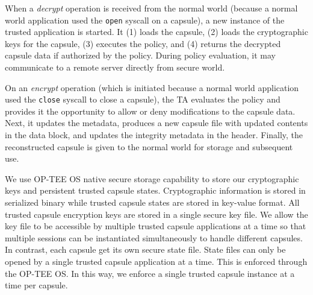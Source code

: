 When a {\em decrypt} operation is received from the normal world (because a
normal world application used the {\tt open} syscall on a capsule), a new
instance of the trusted application is started. It (1) loads the capsule, (2)
loads the cryptographic keys for the capsule, (3) executes the policy, and (4)
returns the decrypted capsule data if authorized by the policy. During policy
evaluation, it may communicate to a remote server directly from secure world.

On an {\em encrypt} operation (which is initiated because a normal world
application used the {\tt close} syscall to close a capsule), the TA evaluates
the policy and provides it the opportunity to allow or deny modifications to the
capsule data. Next, it updates the metadata, produces a new capsule file with
updated contents in the data block, and updates the integrity metadata in the
header. Finally, the reconstructed capsule is given to the normal world for
storage and subsequent use.



We use OP-TEE OS native secure storage capability to store our cryptographic
keys and persistent trusted capsule states. Cryptographic information is stored
in serialized binary while trusted capsule states are stored in key-value
format. All trusted capsule encryption keys are stored in a single secure key
file. We allow the key file to be accessible by multiple trusted capsule
applications at a time so that multiple sessions can be instantiated
simultaneously to handle different capsules. In contrast, each capsule get its
own secure state file. State files can only be opened by a single trusted
capsule application at a time. This is enforced through the OP-TEE OS. In this
way, we enforce a single trusted capsule instance at a time per capsule.

